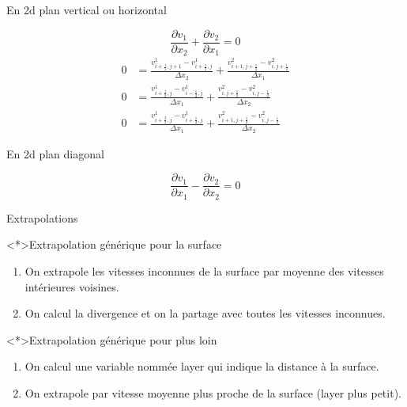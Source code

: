 \begin{frame}{En 2d plan vertical ou horizontal}


\begin{equation*}
 \frac{\partial v_{1}}{\partial x_{2}}+\frac{\partial v_{2}}{\partial x_{1}}=0
 \end{equation*}
 \begin{align*}
  0&\textstyle=\frac{v^{1}_{i+\frac{1}{2},j+1}-v^{1}_{i+\frac{1}{2},j}}{\Delta x_{2}}+\frac{v^{2}_{i+1,j+\frac{1}{2}}-v^{2}_{i,j+\frac{1}{2}}}{\Delta x_{1}}\\
  0&\textstyle=\frac{v^{1}_{i+\frac{1}{2},j}-v^{1}_{i-\frac{1}{2},j}}{\Delta x_{1}}+\frac{v^{2}_{i,j+\frac{1}{2}}-v^{2}_{i,j-\frac{1}{2}}}{\Delta x_2}\\
  0&\textstyle=\frac{v^{1}_{i+\frac{3}{2},j}-v^{1}_{i+\frac{1}{2},j}}{\Delta x_{1}}+\frac{v^{2}_{i+1,j+\frac{1}{2}}-v^{2}_{i,j-\frac{1}{2}}}{\Delta x_2}
 \end{align*}


\end{frame}

\begin{frame}{En 2d plan diagonal}

 \begin{equation*}
  \frac{\partial v_{1}}{\partial x_{1}}-\frac{\partial v_{2}}{\partial x_{2}}=0
 \end{equation*}
 


\end{frame}

\begin{frame}[<+->]{Extrapolations}

\begin{block}<*>{Extrapolation générique pour la surface}
\begin{enumerate}
 \item On extrapole les vitesses inconnues de la surface par moyenne des vitesses intérieures voisines.
 \item On calcul la divergence et on la partage avec toutes les vitesses inconnues.
\end{enumerate}
\end{block}

\begin{block}<*>{Extrapolation générique pour plus loin}
\begin{enumerate}
 \item On calcul une variable nommée layer qui indique la distance à la surface.
 \item On extrapole par vitesse moyenne plus proche de la surface (layer plus petit).
\end{enumerate}

 
\end{block}
 
\end{frame}


